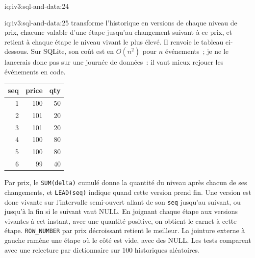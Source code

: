 \begin{solution}{iq:iv3:sql-and-data:24}
\end{solution}

\begin{solution}{iq:iv3:sql-and-data:25}
 transforme l'historique en versions de chaque niveau de prix, chacune valable d'une étape jusqu'au changement suivant à ce prix, et retient à chaque étape le niveau vivant le plus élevé. Il renvoie le tableau ci-dessous. Sur SQLite, son coût est en $O(n^2)$ pour $n$ événements~; je ne le lancerais donc pas sur une journée de données~: il vaut mieux rejouer les événements en code.
\enlargethispage{-3\baselineskip}%
\label{lst:iv3:sq:best}
\begin{center}\small
\begin{tabular}{rrr}
seq & price & qty\\\hline
1 & 100 & 50\\
2 & 101 & 20\\
3 & 101 & 20\\
4 & 100 & 80\\
5 & 100 & 80\\
6 & 99 & 40
\end{tabular}
\end{center}
Par prix, le \texttt{SUM(delta)} cumulé donne la quantité du niveau après chacun de ses changements, et \texttt{LEAD(seq)} indique quand cette version prend fin. Une version est donc vivante sur l'intervalle semi-ouvert allant de son \texttt{seq} jusqu'au suivant, ou jusqu'à la fin si le suivant vaut NULL. En joignant chaque étape aux versions vivantes à cet instant, avec une quantité positive, on obtient le carnet à cette étape. \texttt{ROW\_NUMBER} par prix décroissant retient le meilleur. La jointure externe à gauche ramène une étape où le côté est vide, avec des NULL. Les tests comparent avec une relecture par dictionnaire sur 100 historiques aléatoires.


\end{solution}
